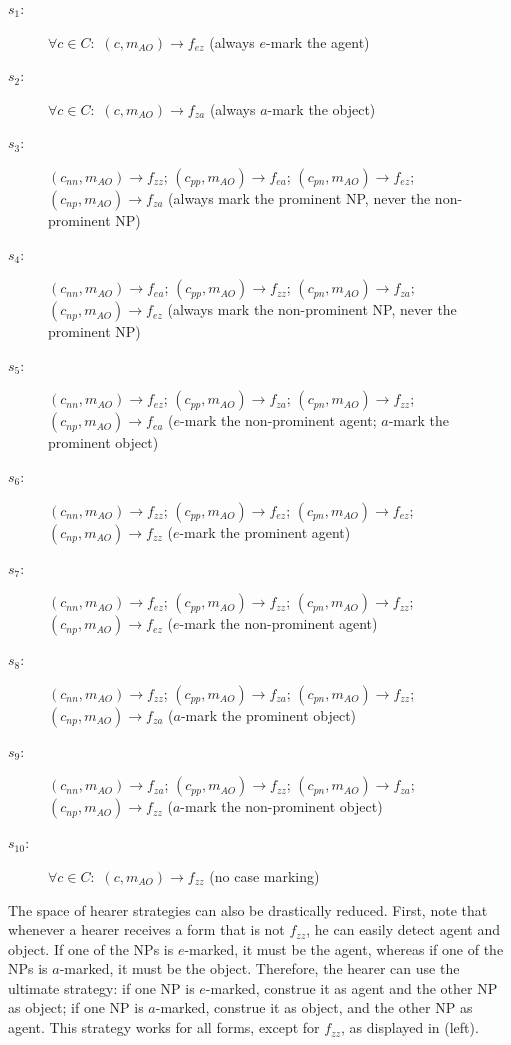 \documentclass[output=paper,hidelinks]{langscibook}
\begin{document}
\begin{description}
\item[$s_1$:] $\forall c \in C:$ $(c,m_{AO}) \rightarrow f_{ez}$ (always $e$-mark the agent)
\item[$s_2$:] $\forall c \in C:$ $(c,m_{AO}) \rightarrow f_{za}$ (always $a$-mark the object)
\item[$s_3$:] $(c_{nn},m_{AO}) \rightarrow f_{zz}$; $(c_{pp}, m_{AO}) \rightarrow f_{ea}$; $(c_{pn},m_{AO}) \rightarrow f_{ez}$; $(c_{np},m_{AO}) \rightarrow f_{za}$ (always mark the prominent NP, never the non-prominent NP) 
\item[$s_4$:] $(c_{nn}, m_{AO}) \rightarrow f_{ea}$; $(c_{pp},m_{AO}) \rightarrow f_{zz}$; $(c_{pn},m_{AO}) \rightarrow f_{za}$; $(c_{np},m_{AO}) \rightarrow f_{ez}$ (always mark the non-prominent NP, never the prominent NP) 
\item[$s_5$:] $(c_{nn},m_{AO}) \rightarrow f_{ez}$; $(c_{pp},m_{AO}) \rightarrow f_{za}$; $(c_{pn},m_{AO}) \rightarrow f_{zz}$; $(c_{np},m_{AO}) \rightarrow f_{ea}$ ($e$-mark the non-prominent agent; $a$-mark the prominent object) 
\item[$s_6$:] $(c_{nn},m_{AO}) \rightarrow f_{zz}$; $(c_{pp},m_{AO}) \rightarrow f_{ez}$; $(c_{pn},m_{AO}) \rightarrow f_{ez}$; $(c_{np}, m_{AO}) \rightarrow f_{zz}$ ($e$-mark the prominent agent)
\item[$s_7$:] $(c_{nn},m_{AO}) \rightarrow f_{ez}$; $(c_{pp},m_{AO}) \rightarrow f_{zz}$; $(c_{pn},m_{AO}) \rightarrow f_{zz}$; $(c_{np},m_{AO}) \rightarrow f_{ez}$ ($e$-mark the non-prominent agent) 
\item[$s_8$:] $(c_{nn},m_{AO}) \rightarrow f_{zz}$; $(c_{pp},m_{AO}) \rightarrow f_{za}$; $(c_{pn},m_{AO}) \rightarrow f_{zz}$; $(c_{np},m_{AO}) \rightarrow f_{za}$ ($a$-mark the prominent object)
\item[$s_9$:] $(c_{nn},m_{AO}) \rightarrow f_{za}$; $(c_{pp},m_{AO}) \rightarrow f_{zz}$; $(c_{pn},m_{AO}) \rightarrow f_{za}$; $(c_{np},m_{AO}) \rightarrow f_{zz}$ ($a$-mark the non-prominent object)
\item[$s_{10}$:] $\forall c \in C:$ $(c,m_{AO}) \rightarrow f_{zz}$ (no case marking)
\end{description}


The space of hearer strategies can also be drastically reduced. First, note that whenever a hearer receives a form that is not $f_{zz}$, he can easily detect agent and object. If one of the NPs is $e$-marked, it must be the agent, whereas if one of the NPs is $a$-marked, it must be the object. Therefore, the hearer can use the ultimate strategy: if one NP is $e$-marked, construe it as agent and the other NP as object; if one NP is $a$-marked, construe it as object, and the other NP as agent. This strategy works for all forms, except for $f_{zz}$, as displayed in  (left).
\end{document}

